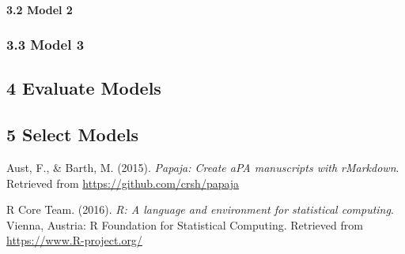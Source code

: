 \documentclass[english,man]{apa6}
\begin{document}
\paragraph{3.2 Model 2}\label{model-2}

\subsubsection{3.3 Model 3}\label{model-3}

\subsection{4 Evaluate Models}\label{evaluate-models}

\subsection*{5 Select Models}\label{select-models}

\hypertarget{refs}{}
\hypertarget{ref-R-papaja}{}
Aust, F., \& Barth, M. (2015). \emph{Papaja: Create aPA manuscripts with
rMarkdown}. Retrieved from \url{https://github.com/crsh/papaja}

\hypertarget{ref-R-base}{}
R Core Team. (2016). \emph{R: A language and environment for statistical
computing}. Vienna, Austria: R Foundation for Statistical Computing.
Retrieved from \url{https://www.R-project.org/}
\end{document}
